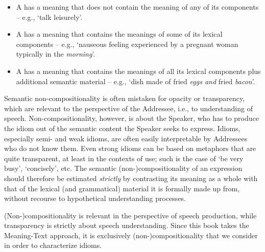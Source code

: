 \begin{itemize}

\item A  has a meaning that does not contain the meaning of any of its components -- e.g.,  `talk leisurely'.

\item A  has a meaning that contains the meanings of some of its lexical components -- e.g.,  `nauseous feeling experienced by a pregnant woman typically in the \emph{morning}'.

\item A  has a meaning that contains the meanings of all its lexical components plus additional semantic material -- e.g.,  `dish made of fried \emph{eggs and} fried \emph{bacon}'.

\end{itemize}

\begin{soundboxnotitle}

Semantic non-compositionality is often mistaken for opacity or transparency, which are relevant to the perspective of the Addressee, i.e., to understanding of speech. Non-compositionality, however, is about the Speaker, who has to produce the idiom out of the semantic content the Speaker seeks to express. Idioms, especially semi- and weak idioms, are often easily interpretable by Addressees who do not know them. Even strong idioms can be based on metaphors that are quite transparent, at least in the contexts of use; such is the case of  `be very busy',  `concisely', etc. The semantic \mbox{(non-)}compositionality of an expression should therefore be estimated \emph{strictly} by contrasting its meaning as a whole with that of the lexical (and grammatical) material it is formally made up from, without recourse to hypothetical understanding processes.

(Non-)compositionality is relevant in the perspective of speech production, while transparency is strictly about speech understanding. Since this book takes the Meaning-Text approach, it is exclusively \mbox{(non-)}compositionality that we consider in order to characterize idioms.

\end{soundboxnotitle}

